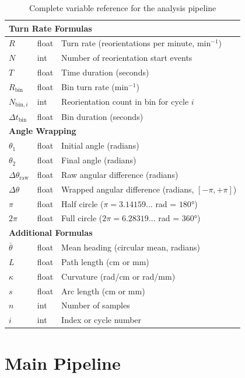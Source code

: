 \documentclass[
  11pt,
]{article}
\begin{document}
\begin{table}[H]
\begin{tabular}{p{3cm}p{2cm}p{9cm}}
\hline
\multicolumn{3}{l}{\textbf{Turn Rate Formulas}} \\
\hline
$R$ & float & Turn rate (reorientations per minute, min$^{-1}$) \\
$N$ & int & Number of reorientation start events \\
$T$ & float & Time duration (seconds) \\
$R_{\text{bin}}$ & float & Bin turn rate (min$^{-1}$) \\
$N_{\text{bin},i}$ & int & Reorientation count in bin for cycle $i$ \\
$\Delta t_{\text{bin}}$ & float & Bin duration (seconds) \\
\hline
\multicolumn{3}{l}{\textbf{Angle Wrapping}} \\
\hline
$\theta_1$ & float & Initial angle (radians) \\
$\theta_2$ & float & Final angle (radians) \\
$\Delta\theta_{\text{raw}}$ & float & Raw angular difference (radians) \\
$\Delta\theta$ & float & Wrapped angular difference (radians, $[-\pi, +\pi]$) \\
$\pi$ & float & Half circle ($\pi = 3.14159...$ rad = $180°$) \\
$2\pi$ & float & Full circle ($2\pi = 6.28319...$ rad = $360°$) \\
\hline
\multicolumn{3}{l}{\textbf{Additional Formulas}} \\
\hline
$\bar{\theta}$ & float & Mean heading (circular mean, radians) \\
$L$ & float & Path length (cm or mm) \\
$\kappa$ & float & Curvature (rad/cm or rad/mm) \\
$s$ & float & Arc length (cm or mm) \\
$n$ & int & Number of samples \\
$i$ & int & Index or cycle number \\
\hline
\end{tabular}
\caption{Complete variable reference for the analysis pipeline}

\end{table}

\hypertarget{main-pipeline}{%
\section{Main Pipeline}\label{main-pipeline}}
\end{document}

